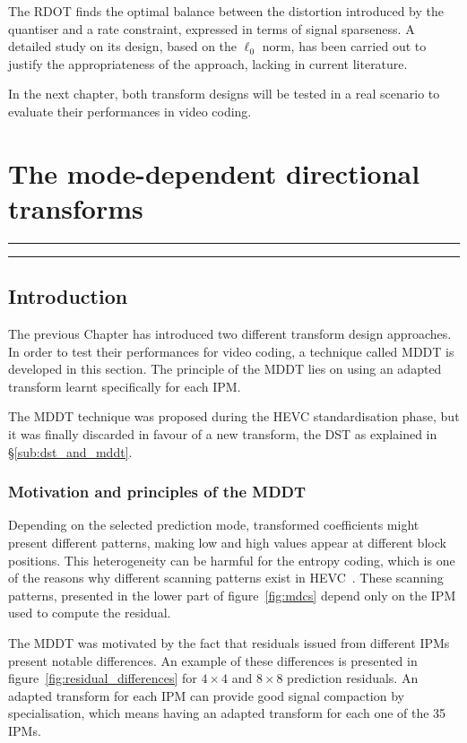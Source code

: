 \documentclass[11pt,a4paper,openright,twoside]{book}
\providecommand{\chaptertoc}{
	\startcontents[chapters]
	\hrule
	\vspace{1em}
	\printcontents[chapters]{}{1}{{\sf\large\bfseries Contents}}
	\vspace{1em}
	\hrule
}
\numberwithin{equation}{section} %
\numberwithin{figure}{section} %
\numberwithin{table}{section} %
\begin{document}
The \ac{RDOT} finds the optimal balance between the distortion introduced by
the quantiser and a rate constraint, expressed in terms of signal sparseness.
A detailed study on its design, based on the $\ell_0$ norm, has been carried
out to justify the appropriateness of the approach, lacking in current
literature.

In the next chapter, both transform designs will be tested in a real
scenario to evaluate their performances in video coding.


\chapter{The mode-dependent directional transforms}
\label{cha:mddt}
\chaptertoc

\section{Introduction}
\label{sec:mddt_introduction}

The previous Chapter has introduced two different transform design approaches.
In order to test their performances for video coding, a technique called
\ac{MDDT} is developed in this section.
The principle of the \ac{MDDT} lies on using an adapted transform learnt
specifically for each \acf{IPM}.

The \ac{MDDT} technique was proposed during the \ac{HEVC} standardisation
phase, but it was finally discarded in favour of a new transform, the
\ac{DST} as explained in \S\ref{sub:dst_and_mddt}.

\subsection{Motivation and principles of the \acs{MDDT}}
\label{sub:mddt_motivation}

Depending on the selected prediction mode, transformed coefficients might
present different patterns, making low and high values appear at different
block positions.
This heterogeneity can be harmful for the entropy coding, which is one of the
reasons why different scanning patterns exist in
\ac{HEVC}~\cite{sole-12-transform-coefficient-coding}.
These scanning patterns, presented in the lower part of
figure~\ref{fig:mdcs} depend only on the \ac{IPM} used to compute the
residual.

The \ac{MDDT} was motivated by the fact that residuals issued from different
\acp{IPM} present notable differences.
An example of these differences is presented in
figure~\ref{fig:residual_differences} for $4\times4$ and $8\times8$ prediction
residuals.
An adapted transform for each \ac{IPM} can provide good signal compaction by
specialisation, which means having an adapted transform for each one of the 35
\acp{IPM}.
\end{document}
